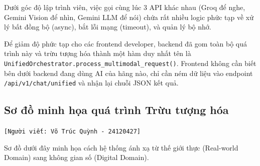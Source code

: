 Dưới góc độ lập trình viên, việc gọi cùng lúc 3 API khác nhau (Groq để nghe, Gemini Vision để nhìn, Gemini LLM để nói) chứa rất nhiều logic phức tạp về xử lý bất đồng bộ (async), bắt lỗi mạng (timeout), và quản lý bộ nhớ.

Để giảm độ phức tạp cho các frontend developer, backend đã gom toàn bộ quá trình này và trừu tượng hóa thành một hàm duy nhất tên là \texttt{UnifiedOrchestrator.process\_multimodal\_request()}. Frontend không cần biết bên dưới backend đang dùng AI của hãng nào, chỉ cần ném dữ liệu vào endpoint \texttt{/api/v1/chat/unified} và nhận lại chuỗi JSON kết quả.

\subsection{Sơ đồ minh họa quá trình Trừu tượng hóa}
\texttt{[Người viết: Võ Trúc Quỳnh - 24120427]}

Sơ đồ dưới đây minh họa cách hệ thống ánh xạ từ thế giới thực (Real-world Domain) sang không gian số (Digital Domain).

